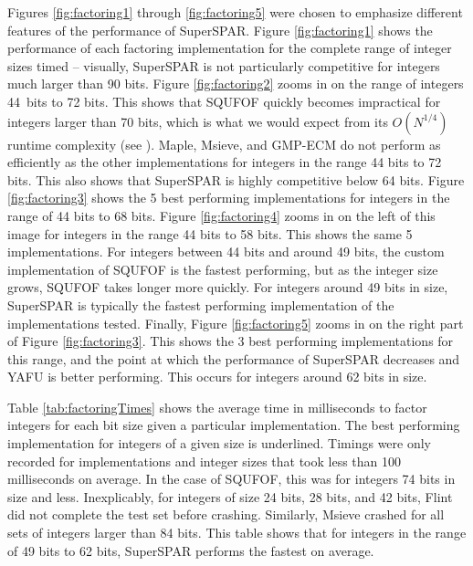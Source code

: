 \documentclass{ucalgthes1}
\theoremstyle{definition}
\begin{document}
Figures \ref{fig:factoring1} through \ref{fig:factoring5} were chosen to emphasize different features of the performance of SuperSPAR.  Figure \ref{fig:factoring1} shows the performance of each factoring implementation for the complete range of integer sizes timed -- visually, SuperSPAR is not particularly competitive for integers much larger than 90 bits.  Figure \ref{fig:factoring2} zooms in on the range of integers \mbox{44 bits} to 72 bits.  This shows that SQUFOF quickly becomes impractical for integers larger than 70 bits, which is what we would expect from its $O(N^{1/4})$ runtime complexity (see \cite[Theorem 4.22]{Gower2008}).  Maple, Msieve, and GMP-ECM do not perform as efficiently as the other implementations for integers in the range 44 bits to 72 bits.  This also shows that SuperSPAR is highly competitive below 64 bits.  Figure \ref{fig:factoring3} shows the 5 best performing implementations for integers in the range of 44 bits to 68 bits.  Figure \ref{fig:factoring4} zooms in on the left of this image for integers in the range 44 bits to 58 bits.  This shows the same 5 implementations.  For integers between 44 bits and around 49 bits, the custom implementation of SQUFOF is the fastest performing, but as the integer size grows, SQUFOF takes longer more quickly.  For integers around 49 bits in size, SuperSPAR is typically the fastest performing implementation of the implementations tested.   Finally, Figure \ref{fig:factoring5} zooms in on the right part of Figure \ref{fig:factoring3}.  This shows the 3 best performing implementations for this range, and the point at which the performance of SuperSPAR decreases and YAFU is better performing.  This occurs for integers around 62 bits in size.

Table \ref{tab:factoringTimes} shows the average time in milliseconds to factor integers for each bit size given a particular implementation.  The best performing implementation for integers of a given size is underlined.  Timings were only recorded for implementations and integer sizes that took less than 100 milliseconds on average.  In the case of SQUFOF, this was for integers 74 bits in size and less.  Inexplicably, for integers of size 24 bits, 28 bits, and 42 bits, Flint did not complete the test set before crashing.  Similarly, Msieve crashed for all sets of integers larger than 84 bits.  This table shows that for integers in the range of 49 bits to 62 bits, SuperSPAR performs the fastest on average.  
\end{document}
